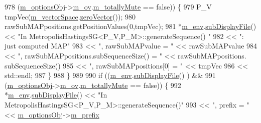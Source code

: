 \begin{DoxyCode}
978           (\hyperlink{class_q_u_e_s_o_1_1_metropolis_hastings_s_g_a5d0bc9f73d50d272aa6bfb5ef5939ef3}{m\_optionsObj}->\hyperlink{class_q_u_e_s_o_1_1_metropolis_hastings_s_g_options_a9d4792d9fc2dc5439b8ab489b0c236eb}{m\_ov}.\hyperlink{class_q_u_e_s_o_1_1_mh_options_values_af812309e81191e88dfdc87c5815141a3}{m\_totallyMute} == \textcolor{keyword}{false})) \{
979         P\_V tmpVec(\hyperlink{class_q_u_e_s_o_1_1_metropolis_hastings_s_g_a2ef17fbfc6a156f03bbfad044b5a75f5}{m\_vectorSpace}.\hyperlink{class_q_u_e_s_o_1_1_vector_space_a92e963bb5cab3eecd290dfe4b8f03b04}{zeroVector}());
980         rawSubMAPpositions.getPositionValues(0,tmpVec);
981         *\hyperlink{class_q_u_e_s_o_1_1_metropolis_hastings_s_g_ac8ea061e55b920e0c8f9bce5c3f20e52}{m\_env}.\hyperlink{class_q_u_e_s_o_1_1_base_environment_a8a0064746ae8dddfece4229b9ad374d6}{subDisplayFile}() << \textcolor{stringliteral}{"In MetropolisHastingsSG<P\_V,P\_M>::generateSequence()
      "}
982                                 << \textcolor{stringliteral}{": just computed MAP"}
983                                 << \textcolor{stringliteral}{", rawSubMAPvalue = "}                       << rawSubMAPvalue
984                                 << \textcolor{stringliteral}{", rawSubMAPpositions.subSequenceSize() = "} << rawSubMAPpositions.
      subSequenceSize()
985                                 << \textcolor{stringliteral}{", rawSubMAPpositions[0] = "}                << tmpVec
986                                 << std::endl;
987       \}
988     \}
989 
990     \textcolor{keywordflow}{if} ((\hyperlink{class_q_u_e_s_o_1_1_metropolis_hastings_s_g_ac8ea061e55b920e0c8f9bce5c3f20e52}{m\_env}.\hyperlink{class_q_u_e_s_o_1_1_base_environment_a8a0064746ae8dddfece4229b9ad374d6}{subDisplayFile}()                   ) &&
991         (\hyperlink{class_q_u_e_s_o_1_1_metropolis_hastings_s_g_a5d0bc9f73d50d272aa6bfb5ef5939ef3}{m\_optionsObj}->\hyperlink{class_q_u_e_s_o_1_1_metropolis_hastings_s_g_options_a9d4792d9fc2dc5439b8ab489b0c236eb}{m\_ov}.\hyperlink{class_q_u_e_s_o_1_1_mh_options_values_af812309e81191e88dfdc87c5815141a3}{m\_totallyMute} == \textcolor{keyword}{false})) \{
992       *\hyperlink{class_q_u_e_s_o_1_1_metropolis_hastings_s_g_ac8ea061e55b920e0c8f9bce5c3f20e52}{m\_env}.\hyperlink{class_q_u_e_s_o_1_1_base_environment_a8a0064746ae8dddfece4229b9ad374d6}{subDisplayFile}() << \textcolor{stringliteral}{"In MetropolisHastingsSG<P\_V,P\_M>::generateSequence()"}
993                               << \textcolor{stringliteral}{", prefix = "}                                         << 
      \hyperlink{class_q_u_e_s_o_1_1_metropolis_hastings_s_g_a5d0bc9f73d50d272aa6bfb5ef5939ef3}{m\_optionsObj}->\hyperlink{class_q_u_e_s_o_1_1_metropolis_hastings_s_g_options_a4f7c510aaa530336d24259e2a89f5d0b}{m\_prefix}

\end{DoxyCode}

